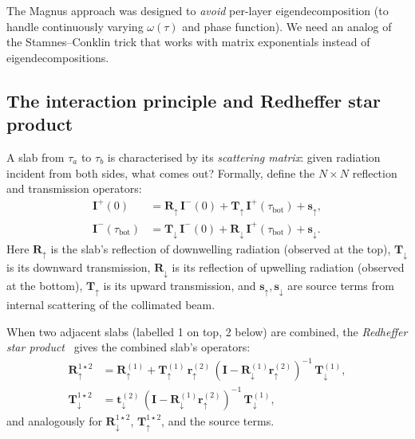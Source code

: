 \documentclass[11pt,a4paper]{article}
\newcommand{\vect}[1]{\bm{#1}}
\newcommand{\mat}[1]{\mathbf{#1}}
\newcommand{\tbot}{\tau_{\mathrm{bot}}}
\theoremstyle{definition}
\begin{document}
The Magnus approach was designed to \emph{avoid} per-layer eigendecomposition
(to handle continuously varying $\omega(\tau)$ and phase function).  We need
an analog of the Stamnes--Conklin trick that works with matrix exponentials
instead of eigendecompositions.

\subsection{The interaction principle and Redheffer star product}
\label{sec:star_product}

A slab from $\tau_a$ to $\tau_b$ is characterised by its
\emph{scattering matrix}: given radiation incident from both sides, what
comes out?  Formally, define the $N\times N$ reflection and transmission
operators:
\begin{align}
  \vect{I}^+(0) &= \mat{R}_\uparrow\,\vect{I}^-(0)
                  + \mat{T}_\uparrow\,\vect{I}^+(\tbot)
                  + \vect{s}_\uparrow, \label{eq:interaction_up} \\
  \vect{I}^-(\tbot) &= \mat{T}_\downarrow\,\vect{I}^-(0)
                      + \mat{R}_\downarrow\,\vect{I}^+(\tbot)
                      + \vect{s}_\downarrow. \label{eq:interaction_down}
\end{align}
Here $\mat{R}_\uparrow$ is the slab's reflection of downwelling radiation
(observed at the top), $\mat{T}_\downarrow$ is its downward transmission,
$\mat{R}_\downarrow$ is its reflection of upwelling radiation (observed at
the bottom), $\mat{T}_\uparrow$ is its upward transmission, and
$\vect{s}_\uparrow,\vect{s}_\downarrow$ are source terms from internal
scattering of the collimated beam.

When two adjacent slabs (labelled 1 on top, 2 below) are combined, the
\emph{Redheffer star product}~\cite{redheffer1962,grant1969} gives the
combined slab's operators:
\begin{align}
  \mat{R}_\uparrow^{1\star 2} &= \mat{R}_\uparrow^{(1)}
    + \mat{T}_\uparrow^{(1)}\,\mat{r}_\uparrow^{(2)}\,
      (\mat{I}-\mat{R}_\downarrow^{(1)}\mat{r}_\uparrow^{(2)})^{-1}\,
      \mat{T}_\downarrow^{(1)}, \label{eq:star_R} \\
  \mat{T}_\downarrow^{1\star 2} &= \mat{t}_\downarrow^{(2)}\,
      (\mat{I}-\mat{R}_\downarrow^{(1)}\mat{r}_\uparrow^{(2)})^{-1}\,
      \mat{T}_\downarrow^{(1)}, \label{eq:star_T}
\end{align}
and analogously for $\mat{R}_\downarrow^{1\star 2}$,
$\mat{T}_\uparrow^{1\star 2}$, and the source terms.
\end{document}
